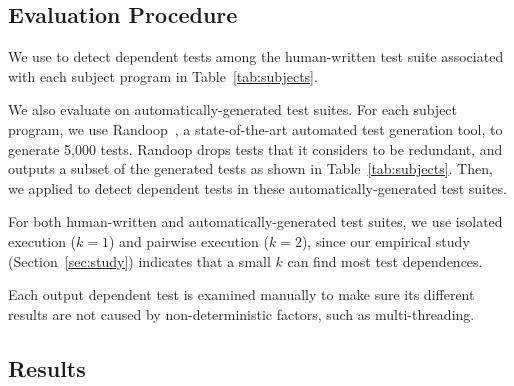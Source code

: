 \subsection{Evaluation Procedure}

We use \ourtool to detect dependent
tests among the human-written test suite 
associated with each subject program in Table~\ref{tab:subjects}.

We also evaluate \ourtool on automatically-generated
test suites. For each subject program, we use
Randoop~\cite{PachecoLET2007}, a state-of-the-art automated
test generation tool, to generate 5,000 tests.
Randoop drops tests that it considers to be redundant,
and outputs a subset of the generated tests as
shown in Table~\ref{tab:subjects}.
Then, we applied \ourtool to detect dependent tests
in these automatically-generated test suites.

For both human-written and automatically-generated
test suites, we use isolated execution ($k = 1$)
and pairwise execution ($k = 2$), since our empirical
study (Section~\ref{sec:study}) indicates that  a small $k$
can find most test dependences. 

Each output dependent test is examined manually to make
sure its different results are not caused by non-deterministic
factors, such as multi-threading.






\subsection{Results}

